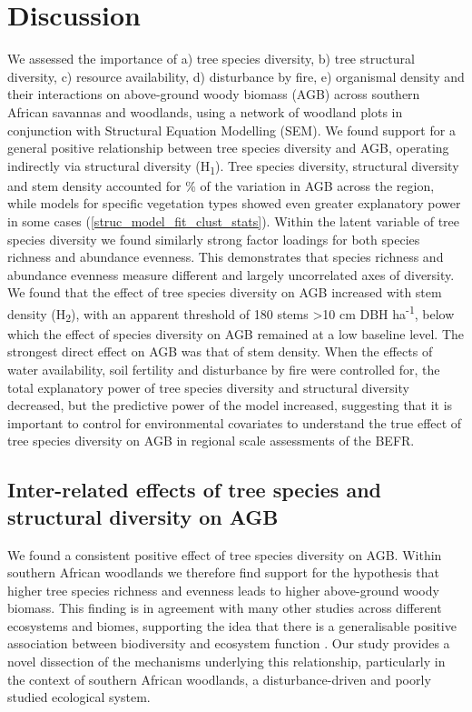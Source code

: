 \documentclass[12pt,a4paper]{article}
\begin{document}
\section{Discussion}

We assessed the importance of a) tree species diversity, b) tree structural diversity, c) resource availability, d) disturbance by fire, e) organismal density and their interactions on above-ground woody biomass (AGB) across southern African savannas and woodlands, using a network of \nplots{} woodland plots in conjunction with Structural Equation Modelling (SEM). We found support for a general positive relationship between tree species diversity and AGB, operating indirectly via structural diversity (H\textsubscript{1}). Tree species diversity, structural diversity and stem density accounted for \smrsq{}\% of the variation in AGB across the region, while models for specific vegetation types showed even greater explanatory power in some cases (\autoref{struc_model_fit_clust_stats}). Within the latent variable of tree species diversity we found similarly strong factor loadings for both species richness and abundance evenness. This demonstrates that species richness and abundance evenness measure different and largely uncorrelated axes of diversity. We found that the effect of tree species diversity on AGB increased with stem density (H\textsubscript{2}), with an apparent threshold of 180 stems >10 cm DBH ha\textsuperscript{-1}, below which the effect of species diversity on AGB remained at a low baseline level. The strongest direct effect on AGB was that of stem density. When the effects of water availability, soil fertility and disturbance by fire were controlled for, the total explanatory power of tree species diversity and structural diversity decreased, but the predictive power of the model increased, suggesting that it is important to control for environmental covariates to understand the true effect of tree species diversity on AGB in regional scale assessments of the BEFR.

\subsection{Inter-related effects of tree species and structural diversity on AGB}

We found a consistent positive effect of tree species diversity on AGB. Within southern African woodlands we therefore find support for the hypothesis that higher tree species richness and evenness leads to higher above-ground woody biomass. This finding is in agreement with many other studies across different ecosystems and biomes, supporting the idea that there is a generalisable positive association between biodiversity and ecosystem function \citep{Liang2016, Cardinale2009}. Our study provides a novel dissection of the mechanisms underlying this relationship, particularly in the context of southern African woodlands, a disturbance-driven and poorly studied ecological system.
\end{document}
